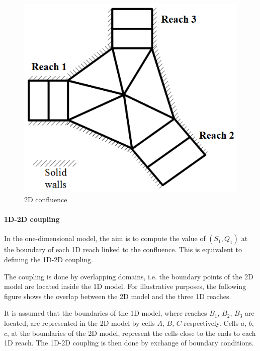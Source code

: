 \begin{figure}[h]
 \begin{center}
  \includegraphics[scale=1.25]{Figures/ConfPar.eps}
  \caption{2D confluence}
 \end{center}
\end{figure}

\paragraph{1D-2D coupling\\}

\hspace*{1cm}

In the one-dimensional model, the aim is to compute the value of $(S_1,Q_1)$ at the boundary of each 1D reach linked to the confluence. This is equivalent to defining the 1D-2D coupling.

\vspace{0.5cm}

The coupling is done by overlapping domains, i.e. the boundary points of the 2D model are located inside the 1D model. For illustrative purposes, the following figure shows the overlap between the 2D model and the three 1D reaches.

\vspace{0.5cm}

It is assumed that the boundaries of the 1D model, where reaches $B_1$, $B_2$, $B_3$ are located, are represented in the 2D model by cells $A$, $B$, $C$ respectively. Cells $a$, $b$, $c$, at the boundaries of the 2D model, represent the cells close to the ends to each 1D reach. The 1D-2D coupling is then done by exchange of boundary conditions.


